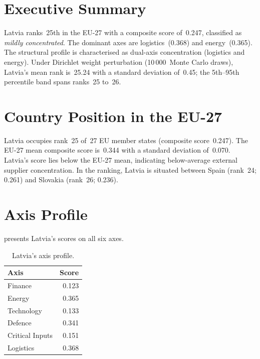 \documentclass[12pt,a4paper]{article}
\begin{document}
\hypersetup{pageanchor=true}
\pagestyle{fancy}
\renewcommand{\headrulewidth}{0.4pt}


\section{Executive Summary}
\label{sec:summary}

Latvia ranks~25th in the EU-27 with a composite \ISI score of~0.247, classified as \emph{mildly concentrated}.  The dominant axes are logistics~(0.368) and energy~(0.365).  The structural profile is characterised as dual-axis concentration (logistics and energy).  Under Dirichlet weight perturbation (10\,000~Monte Carlo draws), Latvia's mean rank is~25.24 with a standard deviation of~0.45; the 5th--95th percentile band spans ranks~25 to~26.


\section{Country Position in the EU-27}
\label{sec:position}

Latvia occupies rank~25 of~27 EU member states (composite score~0.247).  The EU-27 mean composite score is~0.344 with a standard deviation of~0.070.  Latvia's score lies below the EU-27 mean, indicating below-average external supplier concentration.  In the ranking, Latvia is situated between Spain (rank~24; 0.261) and Slovakia (rank~26; 0.236).


\section{Axis Profile}
\label{sec:axis-profile}

 presents Latvia's scores on all six \ISI axes.

\begin{table}[htbp]
\centering\small
\caption{Latvia's \ISI axis profile.}
\label{tab:axis-profile}
\begin{tabular}{@{}lr@{}}
\toprule
\textbf{Axis} & \textbf{Score} \\
\midrule
    Finance           & 0.123 \\
    Energy            & 0.365 \\
    Technology        & 0.133 \\
    Defence           & 0.341 \\
    Critical Inputs   & 0.151 \\
    Logistics         & 0.368 \\
\bottomrule
\end{tabular}
\end{table}
\end{document}
